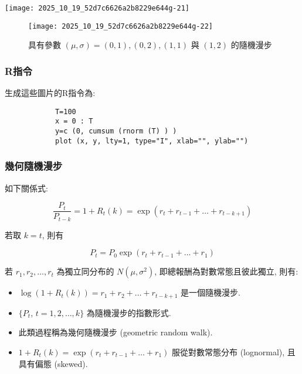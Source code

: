 \documentclass[letterpaper]{article}
\begin{document}
		
		\texttt{[image: 2025\_10\_19\_52d7c6626a2b8229e644g-21]}
		
		\begin{figure}[h]
			\begin{center}
				\texttt{[image: 2025\_10\_19\_52d7c6626a2b8229e644g-22]}
				\caption{ 具有參數 \( (\mu, \sigma) = (0, 1) ,  (0, 2) ,  (1, 1) \) 與 \( (1, 2) \) 的隨機漫步}
			\end{center}
		\end{figure}
		
		\subsubsection{R指令}
		生成這些圖片的R指令為: 
		
		\begin{verbatim}
			T=100
			x = 0 : T
			y=c (0, cumsum (rnorm (T) ) ) 
			plot (x, y, lty=1, type="I", xlab="", ylab="") 
		\end{verbatim}
		
		
		\subsubsection{幾何隨機漫步}
		如下關係式: 
		
		\[
		\frac{P_{t}}{P_{t-k}} = 1 + R_{t} (k) = \exp \left ( r_{t} + r_{t-1} + \ldots + r_{t-k+1} \right) 
		\]
		
		若取 \( k = t \), 則有
		
		\[
		P_{t} = P_{0} \exp \left ( r_{t} + r_{t-1} + \ldots + r_{1} \right) 
		\]
		
		若 \( r_{1}, r_{2}, \ldots, r_{t} \) 為獨立同分布的 \( N (\mu, \sigma^{2}) \), 即總報酬為對數常態且彼此獨立, 則有: 
		
		
		\begin{itemize}
			\item \(\log \left (1 + R_{t} (k) \right) = r_{1} + r_{2} + \ldots + r_{t-k+1}\) 是一個隨機漫步.
			\item \(\{ P_{t}, \, t = 1, 2, \ldots, k \}\) 為隨機漫步的指數形式. 
			\item 此類過程稱為幾何隨機漫步 (geometric random walk).
			\item \(1 + R_{t} (k) = \exp \left ( r_{t} + r_{t-1} + \ldots + r_{1} \right) \) 服從對數常態分布 (lognormal), 且具有偏態 (skewed). 
		\end{itemize}
		
\end{document}
